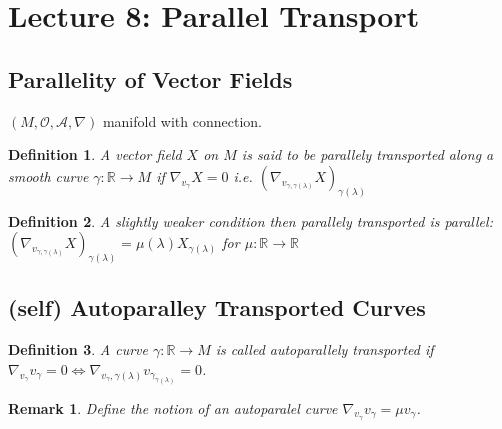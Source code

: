 \documentclass[10pt, oneside]{article}
\newcommand{\R}{\mathbb{R}}
\newtheorem{defn}{Definition}
\newtheorem{remark}{Remark}
\begin{document}
\section{Lecture 8: Parallel Transport \cite{Parallel}}
   \subsection{Parallelity of Vector Fields}
   $(M,\mathcal{O},\mathcal{A},\nabla)$ manifold with connection.
   \begin{defn}
      A vector field $X$ on $M$ is said to be parallely transported along a smooth curve $\gamma: \R \to M$ if $\nabla_{v_\gamma} X = 0$ i.e. $(\nabla_{v_{\gamma, \gamma(\lambda)}}X)_{\gamma (\lambda)}$
   \end{defn}
   \begin{defn}
      A slightly weaker condition then parallely transported is parallel: $(\nabla_{v_{\gamma,\gamma (\lambda)}} X)_{\gamma (\lambda)} = \mu (\lambda) X_{\gamma (\lambda)}$ for $\mu: \R \to \R$
   \end{defn}
   \subsection{(self) Autoparalley Transported Curves}
   \begin{defn}
   A curve $\gamma: \R \to M$ is called autoparallely transported if $\nabla_{v_\gamma} v_\gamma = 0 \iff \nabla_{v_\gamma,\gamma (\lambda)} v_{\gamma_{\gamma(\lambda)}} = 0$.
   \end{defn}
   \begin{remark}
      Define the notion of an autoparalel curve $\nabla_{v_\gamma} v_\gamma = \mu v_\gamma$.
   \end{remark}
\end{document}
